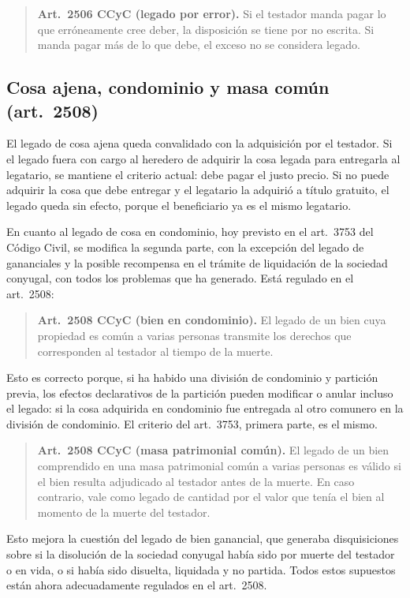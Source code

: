 \documentclass[12pt,oneside]{book}
\begin{document}
\begin{quote}
\textbf{Art.~2506 CCyC (legado por error).} Si el testador manda pagar lo que erróneamente cree deber, la disposición se tiene por no escrita. Si manda pagar más de lo que debe, el exceso no se considera legado.
\end{quote}

\subsection{Cosa ajena, condominio y masa común (art.~2508)}

El legado de cosa ajena queda convalidado con la adquisición por el testador. Si el legado fuera con cargo al heredero de adquirir la cosa legada para entregarla al legatario, se mantiene el criterio actual: debe pagar el justo precio. Si no puede adquirir la cosa que debe entregar y el legatario la adquirió a título gratuito, el legado queda sin efecto, porque el beneficiario ya es el mismo legatario.

En cuanto al legado de cosa en condominio, hoy previsto en el art.~3753 del Código Civil, se modifica la segunda parte, con la excepción del legado de gananciales y la posible recompensa en el trámite de liquidación de la sociedad conyugal, con todos los problemas que ha generado. Está regulado en el art.~2508:

\begin{quote}
\textbf{Art.~2508 CCyC (bien en condominio).} El legado de un bien cuya propiedad es común a varias personas transmite los derechos que corresponden al testador al tiempo de la muerte.
\end{quote}

Esto es correcto porque, si ha habido una división de condominio y partición previa, los efectos declarativos de la partición pueden modificar o anular incluso el legado: si la cosa adquirida en condominio fue entregada al otro comunero en la división de condominio. El criterio del art.~3753, primera parte, es el mismo.

\begin{quote}
\textbf{Art.~2508 CCyC (masa patrimonial común).} El legado de un bien comprendido en una masa patrimonial común a varias personas es válido si el bien resulta adjudicado al testador antes de la muerte. En caso contrario, vale como legado de cantidad por el valor que tenía el bien al momento de la muerte del testador.
\end{quote}

Esto mejora la cuestión del legado de bien ganancial, que generaba disquisiciones sobre si la disolución de la sociedad conyugal había sido por muerte del testador o en vida, o si había sido disuelta, liquidada y no partida. Todos estos supuestos están ahora adecuadamente regulados en el art.~2508.
\end{document}
